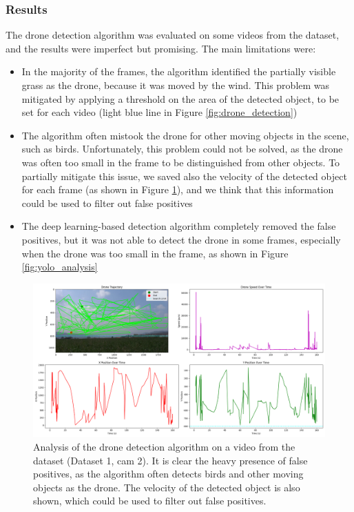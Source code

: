 \documentclass[11pt]{article}
\begin{document}
\subsubsection*{Results}
\label{sec:drone_detection_results}

The drone detection algorithm was evaluated on some videos from the dataset, and the results were imperfect but promising. The main limitations were:

\begin{itemize}
    \item In the majority of the frames, the algorithm identified the partially visible grass as the drone, because it was moved by the wind. This problem was mitigated by applying a threshold on the area of the detected object, to be set for each video (light blue line in Figure \ref{fig:drone_detection})
    \item The algorithm often mistook the drone for other moving objects in the scene, such as birds. Unfortunately, this problem could not be solved, as the drone was often too small in the frame to be distinguished from other objects. To partially mitigate this issue, we saved also the velocity of the detected object for each frame (as shown in Figure \ref{fig:detection_plots}), and we think that this information could be used to filter out false positives
    \item The deep learning-based detection algorithm completely removed the false positives, but it was not able to detect the drone in some frames, especially when the drone was too small in the frame, as shown in Figure \ref{fig:yolo_analysis}
\end{itemize}

\begin{figure}[H]
    \centering
    \includegraphics[width=\textwidth]{imgs/drone_tracking_output_trajectory.png}
    \caption{Analysis of the drone detection algorithm on a video from the dataset (Dataset 1, cam 2). It is clear the heavy presence of false positives, as the algorithm often detects birds and other moving objects as the drone. The velocity of the detected object is also shown, which could be used to filter out false positives.}
    \label{fig:detection_plots}
\end{figure}
\end{document}
